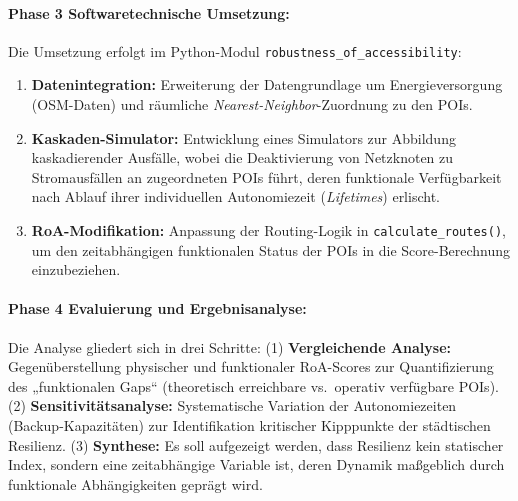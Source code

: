 \paragraph{Phase 3 Softwaretechnische Umsetzung:}
Die Umsetzung erfolgt im Python-Modul \texttt{robustness\_of\_accessibility}:
\begin{enumerate}
    \item \textbf{Datenintegration:} Erweiterung der Datengrundlage um Energieversorgung (OSM-Daten) und räumliche \textit{Nearest-Neighbor}-Zuordnung zu den POIs.
    \item \textbf{Kaskaden-Simulator:} Entwicklung eines Simulators zur Abbildung \newline kaskadierender Ausfälle, wobei die Deaktivierung von Netzknoten zu Stromausfällen an zugeordneten POIs führt, deren funktionale Verfügbarkeit nach Ablauf ihrer individuellen Autonomiezeit (\textit{Lifetimes}) erlischt.
    \item \textbf{RoA-Modifikation:} Anpassung der Routing-Logik in \texttt{calculate\_routes()}, um den zeitabhängigen funktionalen Status der POIs in die Score-Berechnung einzubeziehen.
\end{enumerate}

\paragraph{Phase 4 Evaluierung und Ergebnisanalyse:}
Die Analyse gliedert sich in drei Schritte:
(1) \textbf{Vergleichende Analyse:} Gegenüberstellung physischer und funktionaler RoA-Scores zur Quantifizierung des „funktionalen Gaps“ (theoretisch erreichbare vs.\ operativ verfügbare POIs).
(2) \textbf{Sensitivitätsanalyse:} Systematische Variation der Autonomiezeiten (Backup-Kapazitäten) zur Identifikation kritischer Kipppunkte der städtischen Resilienz.
(3) \textbf{Synthese:} Es soll aufgezeigt werden, dass Resilienz kein statischer Index, sondern eine zeitabhängige Variable ist, deren Dynamik maßgeblich durch funktionale Abhängigkeiten geprägt wird.

